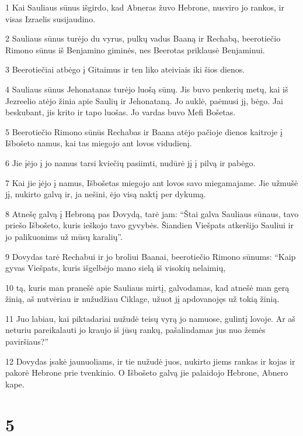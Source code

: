 \par 1 Kai Sauliaus sūnus išgirdo, kad Abneras žuvo Hebrone, nusviro jo rankos, ir visas Izraelis susijaudino. 
\par 2 Sauliaus sūnus turėjo du vyrus, pulkų vadus Baaną ir Rechabą, beerotiečio Rimono sūnus iš Benjamino giminės, nes Beerotas priklausė Benjaminui. 
\par 3 Beerotiečiai atbėgo į Gitaimus ir ten liko ateiviais iki šios dienos. 
\par 4 Sauliaus sūnus Jehonatanas turėjo luošą sūnų. Jis buvo penkerių metų, kai iš Jezreelio atėjo žinia apie Saulių ir Jehonataną. Jo auklė, paėmusi jį, bėgo. Jai beskubant, jis krito ir tapo luošas. Jo vardas buvo Mefi Bošetas. 
\par 5 Beerotiečio Rimono sūnūs Rechabas ir Baana atėjo pačioje dienos kaitroje į Išbošeto namus, kai tas miegojo ant lovos vidudienį. 
\par 6 Jie įėjo į jo namus tarsi kviečių pasiimti, nudūrė jį į pilvą ir pabėgo. 
\par 7 Kai jie įėjo į namus, Išbošetas miegojo ant lovos savo miegamajame. Jie užmušė jį, nukirto galvą ir, ja nešini, ėjo visą naktį per dykumą. 
\par 8 Atnešę galvą į Hebroną pas Dovydą, tarė jam: “Štai galva Sauliaus sūnaus, tavo priešo Išbošeto, kuris ieškojo tavo gyvybės. Šiandien Viešpats atkeršijo Sauliui ir jo palikuonims už mūsų karalių”. 
\par 9 Dovydas tarė Rechabui ir jo broliui Baanai, beerotiečio Rimono sūnums: “Kaip gyvas Viešpats, kuris išgelbėjo mano sielą iš visokių nelaimių, 
\par 10 tą, kuris man pranešė apie Sauliaus mirtį, galvodamas, kad atnešė man gerą žinią, aš nutvėriau ir nužudžiau Ciklage, užuot jį apdovanojęs už tokią žinią. 
\par 11 Juo labiau, kai piktadariai nužudė teisų vyrą jo namuose, gulintį lovoje. Ar aš neturiu pareikalauti jo kraujo iš jūsų rankų, pašalindamas jus nuo žemės paviršiaus?” 
\par 12 Dovydas įsakė jaunuoliams, ir tie nužudė juos, nukirto jiems rankas ir kojas ir pakorė Hebrone prie tvenkinio. O Išbošeto galvą jie palaidojo Hebrone, Abnero kape.



\chapter{5}

